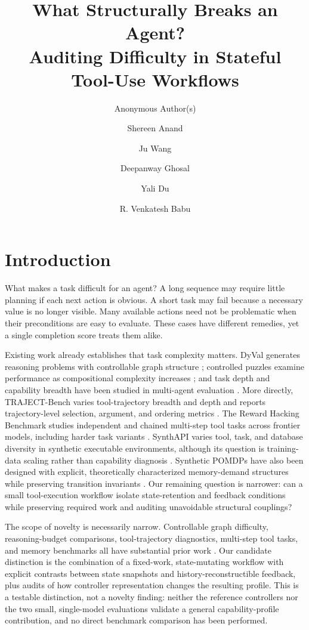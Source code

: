 \documentclass[sigconf,nonacm]{acmart}
\title{What Structurally Breaks an Agent?\\
Auditing Difficulty in Stateful Tool-Use Workflows}
\author{Anonymous Author(s)}
\author{Shereen Anand}
\affiliation{\institution{Amazon}}
\author{Ju Wang}
\affiliation{\institution{University College London}
  \country{United Kingdom}}
\author{Deepanway Ghosal}
\affiliation{\institution{Google DeepMind}
  \country{India}}
\author{Yali Du}
\affiliation{\institution{King's College London}
  \country{United Kingdom}}
\author{R. Venkatesh Babu}
\affiliation{\institution{Indian Institute of Science}
  \city{Bengaluru}
  \country{India}}
\begin{document}
\maketitle
\fancyhf{}
\fancyfoot[C]{\thepage}
\renewcommand{\headrulewidth}{0pt}
\raggedbottom

\section{Introduction}
What makes a task difficult for an agent? A long sequence may require little
planning if each next action is obvious. A short task may fail because a
necessary value is no longer visible. Many available actions need not be
problematic when their preconditions are easy to evaluate. These cases have
different remedies, yet a single completion score treats them alike.

Existing work already establishes that task complexity matters.
DyVal generates reasoning problems with controllable graph structure
\cite{dyval}; controlled puzzles examine performance as compositional complexity
increases \cite{illusion}; and task depth and capability breadth have been
studied in multi-agent evaluation \cite{tang}. More directly, TRAJECT-Bench
varies tool-trajectory breadth and depth and reports trajectory-level
selection, argument, and ordering metrics \cite{traject}. The Reward Hacking
Benchmark studies independent and chained multi-step tool tasks across
frontier models, including harder task variants \cite{rhb}. SynthAPI varies
tool, task, and database diversity in synthetic executable environments,
although its question is training-data scaling rather than capability
diagnosis \cite{synthapi}. Synthetic POMDPs have also been designed with explicit, theoretically
characterized memory-demand structures while preserving transition
invariants \cite{mds}. Our remaining question is narrower: can a small
tool-execution workflow isolate state-retention and feedback conditions
while preserving required work and auditing unavoidable structural
couplings?

The scope of novelty is necessarily narrow. Controllable graph difficulty,
reasoning-budget comparisons, tool-trajectory diagnostics, multi-step tool
tasks, and memory benchmarks all have substantial prior work
\cite{dyval,illusion,tokenbudget,apibank,toolbench,appworld,mcpagentbench,
traject,rhb,synthapi,memcalib}. Our candidate distinction is the combination
of a fixed-work, state-mutating workflow with explicit contrasts between
state snapshots and history-reconstructible feedback, plus audits of how
controller representation changes the resulting profile. This is a
testable distinction, not a novelty finding: neither the reference
controllers nor the two small, single-model evaluations validate a general
capability-profile contribution, and no direct benchmark comparison has been
performed.
\end{document}
